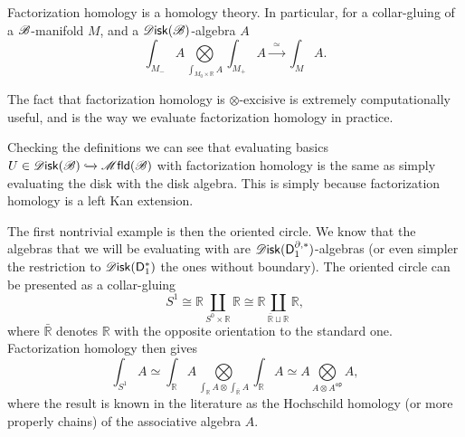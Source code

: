 \documentclass[../text]{subfiles}
\begin{document}
\begin{proposition}\label{prop:homology=disk_alg}
    Factorization homology is a homology theory. In particular, for a collar-gluing of a $\mathscr{B}$-manifold $M$, and a $\disk(\bstr)$-algebra $A$
    \begin{equation}
        \int_{M_-} A  \bigotimes\limits_{\int_{M_0 \times \mathbb{R}} A} \int_{M_+} A \xrightarrow{\ \ \simeq \ \ } \int_M A.
    \end{equation}
\end{proposition}

\begin{remark}
    The fact that factorization homology is $\otimes$-excisive is extremely computationally useful, and is the way we evaluate factorization homology in practice.
\end{remark}


\begin{example}
    Checking the definitions we can see that evaluating basics $U \in \disk(\bstr) \xhookrightarrow{} \mfld(\bstr)$ with factorization homology is the same as simply evaluating the disk with the disk algebra. This is simply because factorization homology is a left Kan extension.

    The first nontrivial example is then the oriented circle. We know that the algebras that we will be evaluating with are $\disk (\mathsf{D}_1^{\partial, *})$-algebras (or even simpler the restriction to $\disk (\mathsf{D}_1^{*})$ the ones without boundary). The oriented circle can be presented as a collar-gluing
    \begin{equation}
        S^1 \cong \mathbb{R} \coprod\limits_{S^0 \times \mathbb{R}} \mathbb{R} \cong \mathbb{R} \coprod\limits_{\bar{\mathbb{R}}\sqcup \mathbb{R}} \mathbb{R},
    \end{equation}
    where $\bar{\mathbb{R}}$ denotes $\mathbb{R}$ with the opposite orientation to the standard one. Factorization homology then gives
    \begin{equation}
        \int_{S^1} A \simeq \int_{\mathbb{R}} A \bigotimes\limits_{\int_{\mathbb{R}} A \otimes \int_{\bar{\mathbb{R}}} A} \int_{\mathbb{R}} A \simeq A \bigotimes\limits_{A \otimes A^{\mathsf{op}}} A,
    \end{equation}
    where the result is known in the literature as the Hochschild homology (or more properly chains) of the associative algebra $A$.
\end{example}
\end{document}
